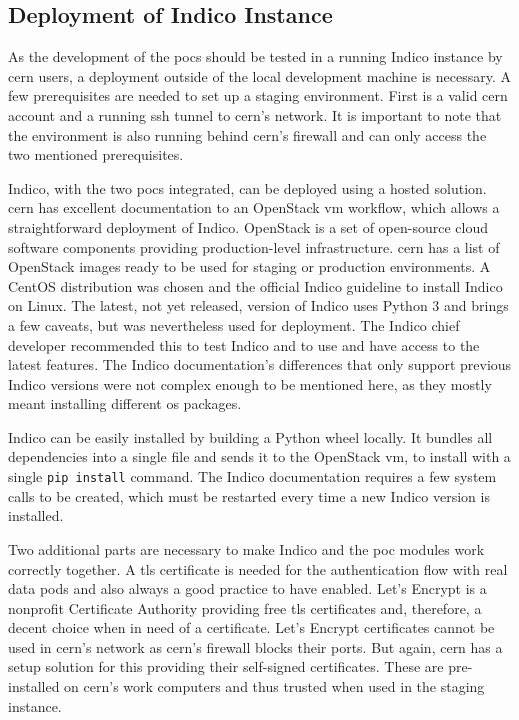 \subsection{Deployment of Indico Instance}

As the development of the \glspl{poc} should be tested in a running Indico instance by \gls{cern} users, a deployment outside of the local development machine is necessary. A few prerequisites are needed to set up a staging environment. First is a valid \gls{cern} account and a running \gls{ssh} tunnel to \gls{cern}'s network. It is important to note that the environment is also running behind \gls{cern}'s firewall and can only access the two mentioned prerequisites.

Indico, with the two \glspl{poc} integrated, can be deployed using a hosted solution. \gls{cern} has excellent documentation to an OpenStack \gls{vm} \cite{openstack} workflow, which allows a straightforward deployment of Indico. OpenStack is a set of open-source cloud software components providing production-level infrastructure. \gls{cern} has a list of OpenStack images ready to be used for staging or production environments. A CentOS \cite{centos} distribution was chosen and the official Indico guideline to install Indico on Linux. The latest, not yet released, version of Indico uses Python 3 and brings a few caveats, but was nevertheless used for deployment. The Indico chief developer recommended this to test Indico and to use and have access to the latest features. The Indico documentation's differences that only support previous Indico versions were not complex enough to be mentioned here, as they mostly meant installing different \gls{os} packages.

Indico can be easily installed by building a Python wheel locally. It bundles all dependencies into a single file and sends it to the OpenStack \gls{vm}, to install with a single \texttt{pip install} command. The Indico documentation requires a few system calls to be created, which must be restarted every time a new Indico version is installed.

Two additional parts are necessary to make Indico and the \gls{poc} modules work correctly together. A \gls{tls} certificate is needed for the authentication flow with real data pods and also always a good practice to have enabled. Let's Encrypt \cite{letsencrypt} is a nonprofit Certificate Authority providing free \gls{tls} certificates and, therefore, a decent choice when in need of a certificate. Let's Encrypt certificates cannot be used in \gls{cern}'s network as \gls{cern}'s firewall blocks their ports. But again, \gls{cern} has a setup solution for this providing their self-signed certificates. These are pre-installed on \gls{cern}'s work computers and thus trusted when used in the staging instance.


